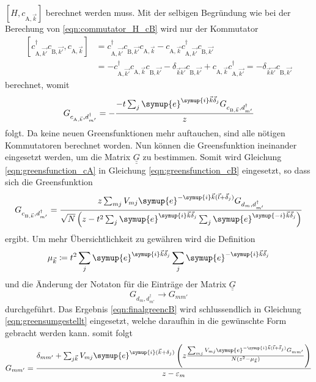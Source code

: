 $\left [H, c_{\text{A},\vec{k}} \right ]$ berechnet werden muss.
Mit der selbigen Begründung wie bei der Berechung von \eqref{eqn:commutator_H_cB} wird nur der Kommutator
\begin{align*}
    \left [ c^\dagger_{\text{A},\vec{k'}} c_{\text{B},\vec{k'}}, c_{\text{A},\vec{k}} \right ]  &= c^\dagger_{\text{A},\vec{k'}}  c_{\text{B},\vec{k'}} c_{\text{A},\vec{k}}
    - c_{\text{A},\vec{k}} c^\dagger_{\text{A},\vec{k'}} c_{\text{B},\vec{k'}} \\
    &= - c^\dagger_{\text{A},\vec{k'}}  c_{\text{A},\vec{k}} c_{\text{B},\vec{k'}} - \delta_{\vec{k}\vec{k'}} c_{\text{B},\vec{k'}} 
    + c_{\text{A},\vec{k}} c^\dagger_{\text{A},\vec{k'}} = - \delta_{\vec{k}\vec{k'}} c_{\text{B},\vec{k'}} 
\end{align*}
berechnet, womit 
\begin{equation}
    G_{c_{\text{A},\vec{k}},d^\dagger_{m'}} = - \frac{-t \sum_{j}\symup{e}^{\symup{i}\vec{k}\vec{\delta}_j} G_{c_{\text{B},\vec{k}}, d^\dagger_{m'}}} {z} \label{eqn:greensfunction_cA}
\end{equation}
folgt.
Da keine neuen Greensfunktionen mehr auftauchen, sind alle nötigen Kommutatoren berechnet worden. 
Nun können die Greensfunktion ineinander eingesetzt werden, um die Matrix $\underline{\underline{G}}$ zu bestimmen.
Somit wird Gleichung \eqref{eqn:greensfunction_cA} in Gleichung \eqref{eqn:greensfunction_cB} eingesetzt, so dass sich die Greensfunktion
\begin{equation}
    G_{c_{\text{B},\vec{k}}, d^\dagger_{m'}} = \frac{z\sum_{mj} V_{mj} \symup{e}^{-\symup{i}\vec{k} (\vec{l}+\vec{\delta}_j)} G_{d_m, d_{m'}^\dagger}}
    {\sqrt{N}\left ( z-t^2\sum_j \symup{e}^{\symup{i}\vec{k}\vec{\delta}_j} \sum_j \symup{e}^{\symup{-i}\vec{k}\vec{\delta}_j} \right )} \label{eqn:finalgreencB}
\end{equation}
ergibt.
Um mehr Übersichtlichkeit zu gewähren wird die Definition
\begin{equation}
     \mu_{\vec{k}} \coloneq t^2 \sum_j \symup{e}^{\symup{i}\vec{k}\vec{\delta}_j} \sum_j \symup{e}^{-\symup{i}\vec{k}\vec{\delta}_j} 
\end{equation}  
und die Änderung der Notaton für die Einträge der Matrix $\underline{\underline{G}}$
\begin{equation*}
    G_{d_m, d^\dagger_{m'}} \to G_{mm'}
\end{equation*}
durchgeführt.
Das Ergebnis \eqref{eqn:finalgreencB} wird schlussendlich in Gleichung \eqref{eqn:greensumgestellt} eingesetzt, welche daraufhin in die gewünschte Form gebracht werden kann.
somit folgt
\begin{equation}
    G_{mm'} = \frac{\delta_{mm'}+\sum_{j\vec{k}} V_{mj} \symup{e}^{\symup{i}(\vec{k} + \delta_j)} 
    \left ( z \frac{\sum_{mj} V_{mj} \symup{e}^{-\symup{i}\vec{k}(\vec{l} + \vec{\delta}_j)}G_{mm'}} {N (z^2-\mu_{\vec{k}})} \right ) } 
    {z-\varepsilon_m}
\end{equation}
